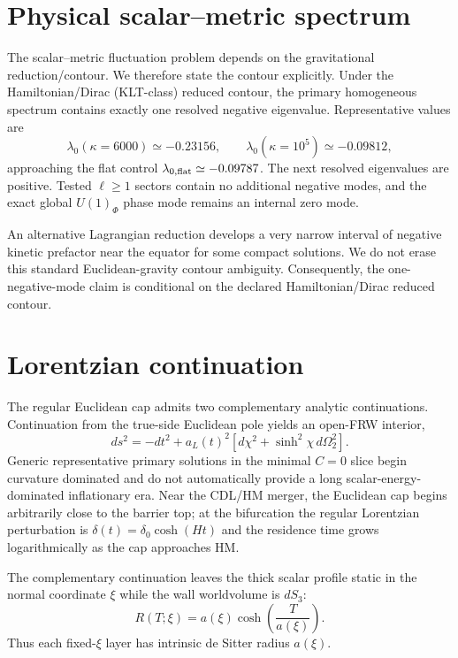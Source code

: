 \documentclass[11pt]{article}
\begin{document}
\section{Physical scalar--metric spectrum}

The scalar--metric fluctuation problem depends on the gravitational reduction/contour. We therefore state the contour explicitly. Under the Hamiltonian/Dirac (KLT-class) reduced contour, the primary homogeneous spectrum contains exactly one resolved negative eigenvalue. Representative values are
\begin{equation}
\lambda_0(\kappa=6000)\simeq-0.23156,\qquad \lambda_0(\kappa=10^5)\simeq-0.09812,
\end{equation}
approaching the flat control $\lambda_{0,\rm flat}\simeq-0.09787$. The next resolved eigenvalues are positive. Tested $\ell\ge1$ sectors contain no additional negative modes, and the exact global $U(1)_\Phi$ phase mode remains an internal zero mode.

An alternative Lagrangian reduction develops a very narrow interval of negative kinetic prefactor near the equator for some compact solutions. We do not erase this standard Euclidean-gravity contour ambiguity. Consequently, the one-negative-mode claim is conditional on the declared Hamiltonian/Dirac reduced contour.

\section{Lorentzian continuation}

The regular Euclidean cap admits two complementary analytic continuations. Continuation from the true-side Euclidean pole yields an open-FRW interior,
\begin{equation}
ds^2=-dt^2+a_L(t)^2\left[d\chi^2+\sinh^2\chi\,d\Omega_2^2\right].
\end{equation}
Generic representative primary solutions in the minimal $C=0$ slice begin curvature dominated and do not automatically provide a long scalar-energy-dominated inflationary era. Near the CDL/HM merger, the Euclidean cap begins arbitrarily close to the barrier top; at the bifurcation the regular Lorentzian perturbation is $\delta(t)=\delta_0\cosh(Ht)$ and the residence time grows logarithmically as the cap approaches HM.

The complementary continuation leaves the thick scalar profile static in the normal coordinate $\xi$ while the wall worldvolume is $dS_3$:
\begin{equation}
R(T;\xi)=a(\xi)\cosh\!\left(\frac{T}{a(\xi)}\right).
\end{equation}
Thus each fixed-$\xi$ layer has intrinsic de Sitter radius $a(\xi)$.
\end{document}
